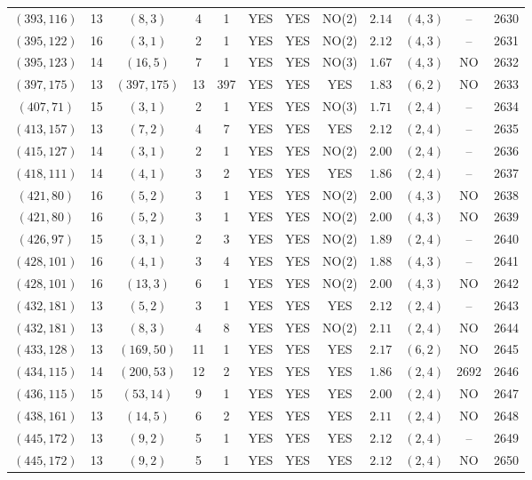\begin{longtable}{|c|c|c|c|c|c|c|c|c|c|c|c|}
$(393,116)$ & 13 & $(8,3)$ & 4 & 1 & YES & YES & NO(2) & $2.14$ & $(4,3)$ & -- & 2630\\
$(395,122)$ & 16 & $(3,1)$ & 2 & 1 & YES & YES & NO(2) & $2.12$ & $(4,3)$ & -- & 2631\\
$(395,123)$ & 14 & $(16,5)$ & 7 & 1 & YES & YES & NO(3) & $1.67$ & $(4,3)$ & NO & 2632\\
$(397,175)$ & 13 & $(397,175)$ & 13 & 397 & YES & YES & YES & $1.83$ & $(6,2)$ & NO & 2633\\
$(407,71)$ & 15 & $(3,1)$ & 2 & 1 & YES & YES & NO(3) & $1.71$ & $(2,4)$ & -- & 2634\\
$(413,157)$ & 13 & $(7,2)$ & 4 & 7 & YES & YES & YES & $2.12$ & $(2,4)$ & -- & 2635\\
$(415,127)$ & 14 & $(3,1)$ & 2 & 1 & YES & YES & NO(2) & $2.00$ & $(2,4)$ & -- & 2636\\
$(418,111)$ & 14 & $(4,1)$ & 3 & 2 & YES & YES & YES & $1.86$ & $(2,4)$ & -- & 2637\\
$(421,80)$ & 16 & $(5,2)$ & 3 & 1 & YES & YES & NO(2) & $2.00$ & $(4,3)$ & NO & 2638\\
$(421,80)$ & 16 & $(5,2)$ & 3 & 1 & YES & YES & NO(2) & $2.00$ & $(4,3)$ & NO & 2639\\
$(426,97)$ & 15 & $(3,1)$ & 2 & 3 & YES & YES & NO(2) & $1.89$ & $(2,4)$ & -- & 2640\\
$(428,101)$ & 16 & $(4,1)$ & 3 & 4 & YES & YES & NO(2) & $1.88$ & $(4,3)$ & -- & 2641\\
$(428,101)$ & 16 & $(13,3)$ & 6 & 1 & YES & YES & NO(2) & $2.00$ & $(4,3)$ & NO & 2642\\
$(432,181)$ & 13 & $(5,2)$ & 3 & 1 & YES & YES & YES & $2.12$ & $(2,4)$ & -- & 2643\\
$(432,181)$ & 13 & $(8,3)$ & 4 & 8 & YES & YES & NO(2) & $2.11$ & $(2,4)$ & NO & 2644\\
$(433,128)$ & 13 & $(169,50)$ & 11 & 1 & YES & YES & YES & $2.17$ & $(6,2)$ & NO & 2645\\
$(434,115)$ & 14 & $(200,53)$ & 12 & 2 & YES & YES & YES & $1.86$ & $(2,4)$ & 2692 & 2646\\
$(436,115)$ & 15 & $(53,14)$ & 9 & 1 & YES & YES & YES & $2.00$ & $(2,4)$ & NO & 2647\\
$(438,161)$ & 13 & $(14,5)$ & 6 & 2 & YES & YES & YES & $2.11$ & $(2,4)$ & NO & 2648\\
$(445,172)$ & 13 & $(9,2)$ & 5 & 1 & YES & YES & YES & $2.12$ & $(2,4)$ & -- & 2649\\
$(445,172)$ & 13 & $(9,2)$ & 5 & 1 & YES & YES & YES & $2.12$ & $(2,4)$ & NO & 2650\\

\end{longtable}
